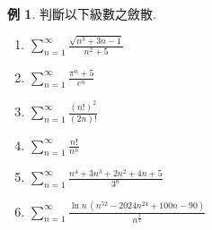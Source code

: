 \documentclass[12pt]{extarticle}
\newcommand{\ds}{\displaystyle}
\theoremstyle{definition}
\newtheorem*{ex}{例}
\begin{document}
\begin{ex} 判斷以下級數之斂散. 
  \setlength{\columnsep}{-20mm}
  \begin{multicols}{3}
    \begin{enumerate}\setlength{\itemsep}{0pt}
      \item $\ds\sum_{n = 1}^\infty\frac{\sqrt{n^3 + 3n - 1}}{n^2 + 5}$
      \item $\ds\sum_{n = 1}^\infty\frac{\pi^n + 5}{e^n}$
      \item $\ds\sum_{n = 1}^\infty\frac{(n!)^2}{(2n)!}$
      \item $\ds\sum_{n = 1}^\infty\frac{n!}{n^n}$
      \item $\ds\sum_{n = 1}^\infty\frac{n^4 + 3n^3 + 2n^2 + 4n + 5}{3^n}$
      \item $\ds\sum_{n = 1}^\infty\frac{\ln n\,(n^{52} - 2024 n^{24} + 100 n - 90)}{n^{\frac{3}{2}}}$
    \end{enumerate}
  \end{multicols}
\end{ex}
\end{document}
